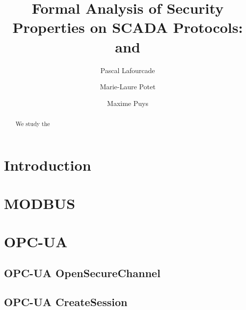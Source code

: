\documentclass[a4paper, twocolumn]{article}
\title{Formal Analysis of Security Properties on SCADA Protocols: \opcua and \modbus}
\author{Pascal Lafourcade \and Marie-Laure Potet \and Maxime Puys}
\date{}
\newcommand{\opcua}{OPC-UA\xspace}
\newcommand{\modbus}{MODBUS\xspace}
\begin{document}
\maketitle

\begin{abstract}
  We study the
\end{abstract}

\section{Introduction}


%
%
%

\section{\modbus}



\section{\opcua}\label{sec:opcua}
\subsection{\opcua OpenSecureChannel}


\subsection{\opcua CreateSession}

\end{document}
